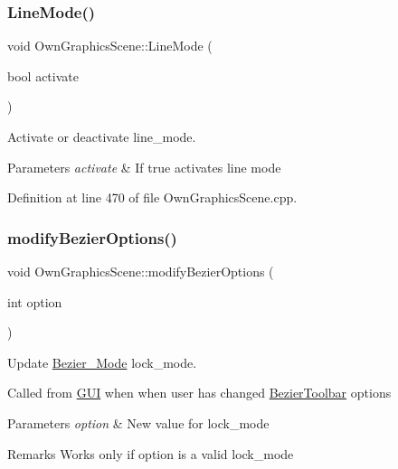 \mbox{\label{classOwnGraphicsScene_a6b7e69131827f0ae64626af378ff9974}} 
\subsubsection{\texorpdfstring{Line\+Mode()}{LineMode()}}
{\footnotesize\ttfamily void Own\+Graphics\+Scene\+::\+Line\+Mode (\begin{DoxyParamCaption}\item[{bool}]{activate }\end{DoxyParamCaption})}



Activate or deactivate line\+\_\+mode. 


\begin{DoxyParams}{Parameters}
{\em activate} & If true activates line mode \\
\hline
\end{DoxyParams}


Definition at line 470 of file Own\+Graphics\+Scene.\+cpp.

\mbox{\label{classOwnGraphicsScene_a302a5f437c44f6fc84f9911e41172734}} 
\subsubsection{\texorpdfstring{modify\+Bezier\+Options()}{modifyBezierOptions()}}
{\footnotesize\ttfamily void Own\+Graphics\+Scene\+::modify\+Bezier\+Options (\begin{DoxyParamCaption}\item[{int}]{option }\end{DoxyParamCaption})}



Update \mbox{\hyperlink{structBezier__Mode}{Bezier\+\_\+\+Mode}} lock\+\_\+mode. 

Called from \mbox{\hyperlink{classGUI}{G\+UI}} when when user has changed \mbox{\hyperlink{structBezierToolbar}{Bezier\+Toolbar}} options 
\begin{DoxyParams}{Parameters}
{\em option} & New value for lock\+\_\+mode \\
\hline
\end{DoxyParams}
\begin{DoxyRemark}{Remarks}
Works only if option is a valid lock\+\_\+mode 
\end{DoxyRemark}


